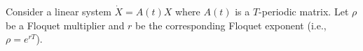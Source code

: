 \documentclass{exam}
\begin{document}
\begin{questions}
\question[30]
Consider a linear system $\dot{X} = A(t)X$ where $A(t)$ is a $T$-periodic matrix. Let $\rho$ be a Floquet multiplier and $r$ be the corresponding Floquet exponent (i.e., $\rho = e^{rT}$).

\end{questions}
\end{document}
